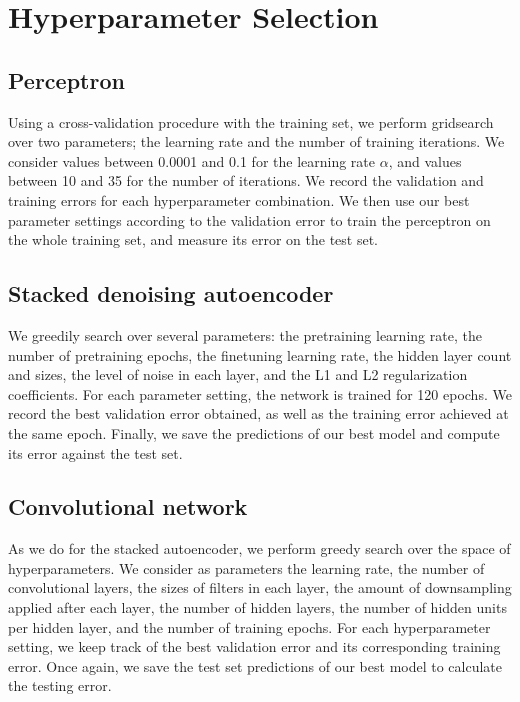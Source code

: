 \documentclass{acm_proc_article-sp}
\begin{document}
\section{Hyperparameter Selection}

\subsection{Perceptron}

Using a cross-validation procedure with the training set, we perform gridsearch over two parameters; the learning rate and the number of training iterations. We consider values between 0.0001 and 0.1 for the learning rate $\alpha$, and values between 10 and 35 for the number of iterations. We record the validation and training errors for each hyperparameter combination. We then use our best parameter settings according to the validation error to train the perceptron on the whole training set, and measure its error on the test set.

\subsection{Stacked denoising autoencoder}

We greedily search over several parameters: the pretraining learning rate, the number of pretraining epochs, the finetuning learning rate, the hidden layer count and sizes, the level of noise in each layer, and the L1 and L2 regularization coefficients. For each parameter setting, the network is trained for 120 epochs. We record the best validation error obtained, as well as the training error achieved at the same epoch. Finally, we save the predictions of our best model and compute its error against the test set.

\subsection{Convolutional network}
As we do for the stacked autoencoder, we perform greedy search over the space of hyperparameters. We consider as parameters the learning rate, the number of convolutional layers, the sizes of filters in each layer, the amount of downsampling applied after each layer, the number of hidden layers, the number of hidden units per hidden layer, and the number of training epochs. For each hyperparameter setting, we keep track of the best validation error and its corresponding training error. Once again, we save the test set predictions of our best model to calculate the testing error.
\end{document}
